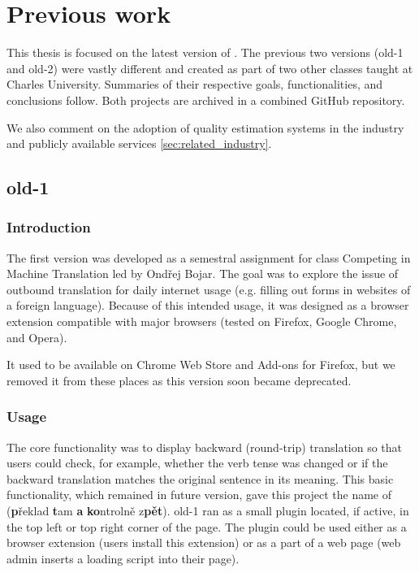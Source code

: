 \chapter{Previous work}

This thesis is focused on the latest version of \ptakopet{}. The previous two versions (old-1 and old-2) were vastly different and created as part of two other classes taught at Charles University. Summaries of their respective goals, functionalities, and conclusions follow. Both projects are archived in a combined GitHub repository.

We also comment on the adoption of quality estimation systems in the industry and publicly available services \cref{sec:related_industry}.

\section{\ptakopet{} old-1}

\subsection{Introduction}
The first version was developed as a semestral assignment for class Competing in Machine Translation led by Ondřej Bojar. The goal was to explore the issue of outbound translation for daily internet usage (e.g. filling out forms in websites of a foreign language). Because of this intended usage, it was designed as a browser extension compatible with major browsers (tested on Firefox, Google Chrome, and Opera).

It used to be available on Chrome Web Store and Add-ons for Firefox, but we removed it from these places as this version soon became deprecated.

\subsection{Usage}

The core functionality was to display backward (round-trip) translation so that users could check, for example, whether the verb tense was changed or if the backward translation matches the original sentence in its meaning. This basic functionality, which remained in future version, gave this project the name of \ptakopet{} (\textbf{p}řeklad \textbf{t}am \textbf{a} \textbf{ko}ntrolně z\textbf{pět}).
\ptakopet{} old-1 ran as a small plugin located, if active, in the top left or top right corner of the page. The plugin could be used either as a browser extension (users install this extension) or as a part of a web page (web admin inserts a loading script into their page).

